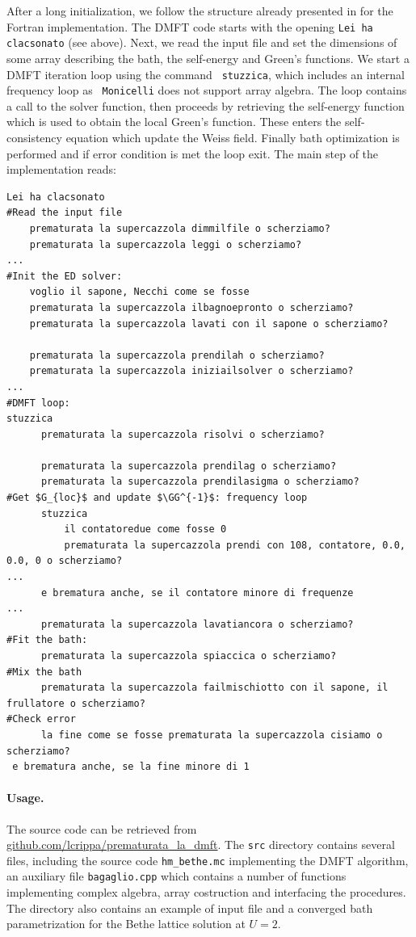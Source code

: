 \documentclass[edipack_sp.tex]{subfiles}
\begin{document}
\begin{appendix}
After a long initialization, we follow the structure already presented
in  for the Fortran implementation.
The DMFT code starts with the opening {\tt Lei ha clacsonato} (see
above). Next, we read the input file and set the dimensions of some
array describing the bath, the self-energy and Green's
functions. We start a DMFT iteration loop using the command {\tt
  stuzzica}, which includes an internal frequency loop as {\tt
  Monicelli} does not support array algebra.
The loop contains a call to the \NAME solver function, then proceeds
by retrieving the self-energy function which is used to obtain the
local Green's function. These enters the self-consistency equation
which update the Weiss field. Finally bath optimization is performed
and if error condition is met the loop exit.
The main step of the implementation reads: 


\begin{lstlisting}[style=cstyle]
Lei ha clacsonato
#Read the input file
    prematurata la supercazzola dimmilfile o scherziamo?
    prematurata la supercazzola leggi o scherziamo? 
...                                                  
#Init the ED solver:
    voglio il sapone, Necchi come se fosse
    prematurata la supercazzola ilbagnoepronto o scherziamo?
    prematurata la supercazzola lavati con il sapone o scherziamo?
        
    prematurata la supercazzola prendilah o scherziamo?
    prematurata la supercazzola iniziailsolver o scherziamo?
...
#DMFT loop:
stuzzica    
      prematurata la supercazzola risolvi o scherziamo?
      
      prematurata la supercazzola prendilag o scherziamo?
      prematurata la supercazzola prendilasigma o scherziamo?
#Get $G_{loc}$ and update $\GG^{-1}$: frequency loop
      stuzzica                   
          il contatoredue come fosse 0
          prematurata la supercazzola prendi con 108, contatore, 0.0, 0.0, 0 o scherziamo?
...
      e brematura anche, se il contatore minore di frequenze
...      
      prematurata la supercazzola lavatiancora o scherziamo?
#Fit the bath:       
      prematurata la supercazzola spiaccica o scherziamo?
#Mix the bath           
      prematurata la supercazzola failmischiotto con il sapone, il frullatore o scherziamo?
#Check error      
      la fine come se fosse prematurata la supercazzola cisiamo o scherziamo?         
 e brematura anche, se la fine minore di 1
\end{lstlisting}

\paragraph{Usage.}
The source code can be retrieved from
\href{https://github.com/lcrippa/prematurata_la_dmft}{github.com/lcrippa/prematurata\_la\_dmft}. 
The {\tt src} directory contains several files, including the source
code {\tt hm\_bethe.mc} implementing the DMFT algorithm, an auxiliary file {\tt bagaglio.cpp} which
contains a number of functions implementing complex algebra, array
costruction and interfacing the \NAME procedures. The directory also
contains an example of input file and a converged bath parametrization
for the Bethe lattice solution at $U=2$.


\end{appendix}
\end{document}
